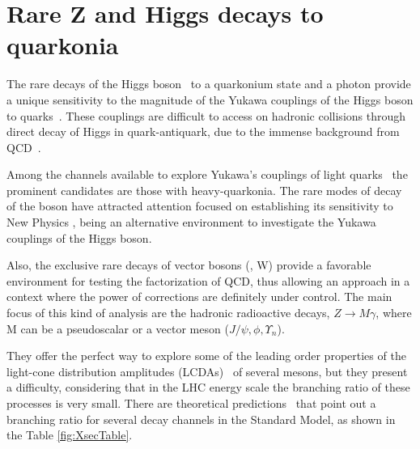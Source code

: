 
\section{Rare Z and Higgs decays to quarkonia}
\label{section_rare_deays}

The rare decays of the Higgs boson~\cite{higgs_discovery_atlas,higgs_discovery_cms} to a quarkonium state and a photon provide a unique sensitivity to the magnitude of the Yukawa couplings of the Higgs boson to quarks~\cite{PhysRevD.88.053003, PhysRevD.90.113010,PhysRevLett.114.191803}. These couplings are difficult to access on hadronic collisions through direct decay of Higgs in quark-antiquark, due to the immense background from QCD~\cite{PhysRevD.89.033014}. 

Among the channels available to explore Yukawa's couplings of light quarks~\cite{PhysRevD.90.113010,PhysRevLett.114.191803} the prominent candidates are those with heavy-quarkonia. The rare modes of decay of the \Z boson have attracted attention focused on establishing its sensitivity to New Physics \cite{PEREZ}, being an alternative environment to investigate the Yukawa couplings of the Higgs boson.


Also, the exclusive rare decays of vector bosons (\Z, W) provide a favorable environment for testing the factorization of QCD, thus allowing an approach in a context where the power of corrections are definitely under control. The main focus of this kind of analysis are the hadronic radioactive decays, $Z\rightarrow M \gamma$, where M can be a pseudoscalar or a vector meson ($J/ \psi, \phi, \Upsilon_{n}$). 

They offer the perfect way to explore some of the leading order properties of the light-cone distribution amplitudes (LCDAs)~\cite{Grossman2015} of several mesons, but they present a difficulty, considering that in the LHC energy scale the branching ratio of these processes is very small. There are theoretical predictions~\cite{PhysRevD.97.016009,PhysRevD.96.116014} that point out a branching ratio for several decay channels in the Standard Model, as shown in the Table \ref{fig:XsecTable}.

